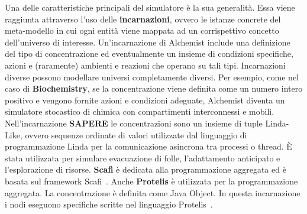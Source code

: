 \documentclass[12pt,a4paper,openright,twoside]{book}
\begin{document}
Una delle caratteristiche principali del simulatore è la sua generalità. Essa viene raggiunta attraverso l'uso delle \textbf{incarnazioni}, ovvero le istanze concrete del meta-modello in cui ogni entità viene mappata ad un corrispettivo concetto dell'universo di interesse. 
Un'incarnazione di Alchemist include una definizione del tipo di concentrazione ed eventualmente un insieme di condizioni specifiche, azioni e (raramente) ambienti e reazioni che operano su tali tipi. 
Incarnazioni diverse possono modellare universi completamente diversi. Per esempio, come nel caso di \textbf{Biochemistry}, se la concentrazione viene definita come un numero intero positivo e vengono fornite azioni e condizioni adeguate, Alchemist diventa un simulatore stocastico di chimica con compartimenti interconnessi e mobili.
Nell'incarnazione \textbf{SAPERE} le concentrazioni sono un insieme di tuple Linda-Like, ovvero sequenze ordinate di valori utilizzate dal linguaggio di programmazione Linda per la comunicazione asincrona tra processi o thread. È stata utilizzata per simulare evacuazione di folle, l'adattamento anticipato e l'esplorazione di risorse.  
\textbf{Scafi} è dedicata alla programmazione aggregata ed è basata sul framework Scafi~\cite{DBLP:journals/softx/CasadeiVAP22}. Anche \textbf{Protelis} è utilizzata per la programmazione aggregata. La concentrazione è definita come Java Object. In questa incarnazione i nodi eseguono specifiche scritte nel linguaggio Protelis~\cite{DBLP:conf/sac/PianiniVB15}. 
\end{document}
